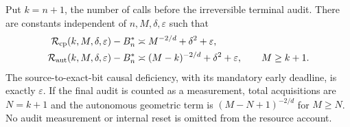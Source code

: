 \begin{corollary}\label{cor:joint}
Put $k=n+1$, the number of calls before the irreversible terminal audit. There are constants independent of $n,M,\delta,\varepsilon$ such that
\begin{align}\label{eq:joint}
 \mathcal R_{\mathrm{cp}}(k,M,\delta,\varepsilon)-B_n^*
 &\asymp M^{-2/d}+\delta^2+\varepsilon,\\
 \mathcal R_{\mathrm{aut}}(k,M,\delta,\varepsilon)-B_n^*
 &\asymp(M-k)^{-2/d}+\delta^2+\varepsilon,\qquad M\ge k+1.\notag
\end{align}
The source-to-exact-bit causal deficiency, with its mandatory early deadline, is exactly $\varepsilon$. If the final audit is counted as a measurement, total acquisitions are $N=k+1$ and the autonomous geometric term is $(M-N+1)^{-2/d}$ for $M\ge N$. No audit measurement or internal reset is omitted from the resource account.
\end{corollary}
